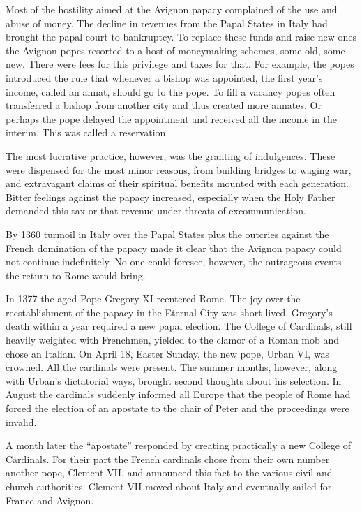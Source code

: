 Most of the hostility aimed at the Avignon papacy complained of the use and abuse of money. The
decline in revenues from the Papal States in Italy had brought the papal court to bankruptcy. To
replace these funds and raise new ones the Avignon popes resorted to a host of moneymaking schemes,
some old, some new. There were fees for this privilege and taxes for that. For example, the popes
introduced the rule that whenever a bishop was appointed, the first year’s income, called an annat,
should go to the pope. To fill a vacancy popes often transferred a bishop from another city and thus
created more annates. Or perhaps the pope delayed the appointment and received all the income in the
interim. This was called a reservation.

The most lucrative practice, however, was the granting of indulgences. These were dispensed for the
most minor reasons, from building bridges to waging war, and extravagant claims of their spiritual
benefits mounted with each generation. Bitter feelings against the papacy increased, especially when
the Holy Father demanded this tax or that revenue under threats of excommunication.

By 1360 turmoil in Italy over the Papal States plus the outcries against the French domination of
the papacy made it clear that the Avignon papacy could not continue indefinitely. No one could
foresee, however, the outrageous events the return to Rome would bring.

In 1377 the aged Pope Gregory XI reentered Rome. The joy over the reestablishment of the papacy in
the Eternal City was short-lived. Gregory’s death within a year required a new papal election. The
College of Cardinals, still heavily weighted with Frenchmen, yielded to the clamor of a Roman mob
and chose an Italian. On April 18, Easter Sunday, the new pope, Urban VI, was crowned. All the
cardinals were present. The summer months, however, along with Urban’s dictatorial ways, brought
second thoughts about his selection. In August the cardinals suddenly informed all Europe that the
people of Rome had forced the election of an apostate to the chair of Peter and the proceedings were
invalid.

A month later the “apostate” responded by creating practically a new College of Cardinals. For their
part the French cardinals chose from their own number another pope, Clement VII, and announced this
fact to the various civil and church authorities. Clement VII moved about Italy and eventually
sailed for France and Avignon.

